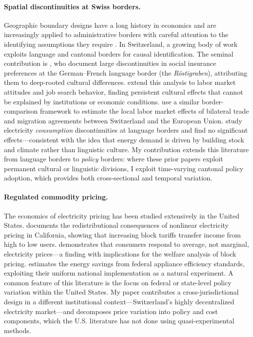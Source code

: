 \documentclass[12pt]{article}
\begin{document}
\paragraph{Spatial discontinuities at Swiss borders.} Geographic boundary designs have a long history in economics \citep{black1999better} and are increasingly applied to administrative borders with careful attention to the identifying assumptions they require \citep{keele2015geographic}. In Switzerland, a growing body of work exploits language and cantonal borders for causal identification. The seminal contribution is \citet{eugster2011demand}, who document large discontinuities in social insurance preferences at the German--French language border (the \textit{Röstigraben}), attributing them to deep-rooted cultural differences. \citet{eugster2017culture} extend this analysis to labor market attitudes and job search behavior, finding persistent cultural effects that cannot be explained by institutions or economic conditions. \citet{egger2015causal} use a similar border-comparison framework to estimate the local labor market effects of bilateral trade and migration agreements between Switzerland and the European Union. \citet{farsi2025energy} study electricity \textit{consumption} discontinuities at language borders and find no significant effects---consistent with the idea that energy demand is driven by building stock and climate rather than linguistic culture. My contribution extends this literature from language borders to \textit{policy} borders: where these prior papers exploit permanent cultural or linguistic divisions, I exploit time-varying cantonal policy adoption, which provides both cross-sectional and temporal variation.

\paragraph{Regulated commodity pricing.} The economics of electricity pricing has been studied extensively in the United States. \citet{borenstein2012redistribution} documents the redistributional consequences of nonlinear electricity pricing in California, showing that increasing block tariffs transfer income from high to low users. \citet{ito2014do} demonstrates that consumers respond to average, not marginal, electricity prices---a finding with implications for the welfare analysis of block pricing. \citet{davis2014effect} estimates the energy savings from federal appliance efficiency standards, exploiting their uniform national implementation as a natural experiment. A common feature of this literature is the focus on federal or state-level policy variation within the United States. My paper contributes a cross-jurisdictional design in a different institutional context---Switzerland's highly decentralized electricity market---and decomposes price variation into policy and cost components, which the U.S. literature has not done using quasi-experimental methods.
\end{document}
